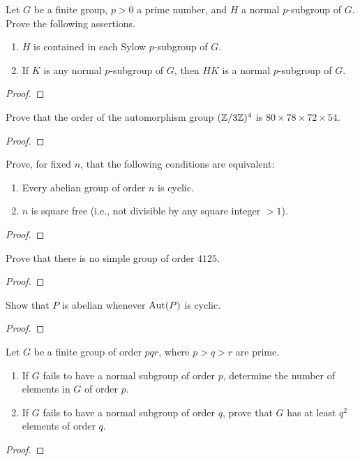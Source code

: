\begin{problem}
Let $G$ be a finite group, $p>0$ a prime number, and $H$ a
normal $p$-subgroup of $G$. Prove the following assertions.
\begin{enumerate}[label=(\alph*)]
\item $H$ is contained in each Sylow $p$-subgroup of $G$.
\item If $K$ is any normal $p$-subgroup of $G$, then $HK$ is a
normal $p$-subgroup of $G$.
\end{enumerate}
\end{problem}
\begin{proof}
\end{proof}

\begin{problem}
Prove that the order of the automorphism group $(\mathbb{Z}/3\mathbb{Z})^4$
is $80\times 78\times 72\times 54$.
\end{problem}
\begin{proof}
\end{proof}

\begin{problem}
Prove, for fixed $n$, that the following conditions are
equivalent:
\begin{enumerate}[label=(\alph*)]
\item Every abelian group of order $n$ is cyclic.
\item $n$ is square free (i.e., not divisible by any square
integer $>1$).
\end{enumerate}
\end{problem}
\begin{proof}
\end{proof}

\begin{problem}
Prove that there is no simple group of order $4125$.
\end{problem}
\begin{proof}
\end{proof}

\begin{problem}
Show that $P$ is abelian whenever $\operatorname{Aut}(P)$ is cyclic.
\end{problem}
\begin{proof}
\end{proof}

\begin{problem}
Let $G$ be a finite group of order $pqr$, where $p>q>r$ are
prime.
\begin{enumerate}[label=(\alph*)]
\item If $G$ fails to have a normal subgroup of order $p$,
determine the number of elements in $G$ of order $p$.
\item If $G$ fails to have a normal subgroup of order $q$,
prove that $G$ has at least $q^2$ elements of order $q$.
\end{enumerate}
\end{problem}
\begin{proof}
\end{proof}


